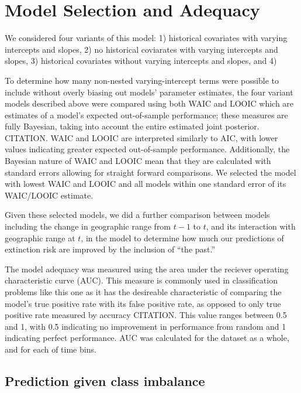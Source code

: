 \documentclass[12pt,letterpaper]{article}
\begin{document}
\section{Model Selection and Adequacy}

We considered four variants of this model: 1) historical covariates with varying intercepts and slopes, 2) no historical coviarates with varying intercepts and slopes, 3) historical covariates without varying intercepts and slopes, and 4)

To determine how many non-nested varying-intercept terms were possible to include without overly biasing out models' parameter estimates, the four variant models described above were compared using both WAIC and LOOIC which are estimates of a model's expected out-of-sample performance; these measures are fully Bayesian, taking into account the entire estimated joint posterior. CITATION. WAIC and LOOIC are interpreted similarly to AIC, with lower values indicating greater expected out-of-sample performance. Additionally, the Bayesian nature of WAIC and LOOIC mean that they are calculated with standard errors allowing for straight forward comparisons. We selected the model with lowest WAIC and LOOIC and all models within one standard error of its WAIC/LOOIC estimate.

Given these selected models, we did a further comparison between models including the change in geographic range from \(t - 1\) to \(t\), and its interaction with geographic range at \(t\), in the model to determine how much our predictions of extinction risk are improved by the inclusion of ``the past.''

The model adequacy was measured using the area under the reciever operating characteristic curve (AUC). This measure is commonly used in classification problems like this one as it has the desireable characteristic of comparing the model's true positive rate with its false positive rate, as opposed to only true positive rate measured by accuracy CITATION. This value ranges between 0.5 and 1, with 0.5 indicating no improvement in performance from random and 1 indicating perfect performance. AUC was calculated for the dataset as a whole, and for each of time bins.


\subsection{Prediction given class imbalance}
\end{document}
